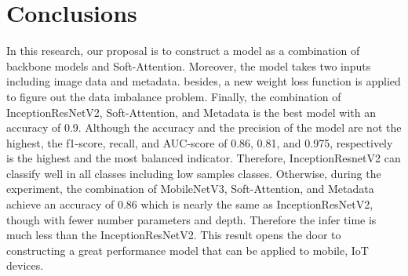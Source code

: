 \documentclass[sensors,article,submit,pdftex,moreauthors]{Definitions/mdpi}
\begin{document}
	\section{Conclusions}
	In this research, our proposal is to construct a model as a combination of backbone models and Soft-Attention. Moreover, the model takes two inputs including image data and metadata. besides, a new weight loss function is applied to figure out the data imbalance problem. Finally, the combination of InceptionResNetV2, Soft-Attention, and Metadata is the best model with an accuracy of 0.9. Although the accuracy and the precision of the model are not the highest, the f1-score, recall, and AUC-score of 0.86, 0.81, and 0.975, respectively is the highest and the most balanced indicator. Therefore, InceptionResnetV2 can classify well in all classes including low samples classes. Otherwise, during the experiment, the combination of MobileNetV3, Soft-Attention, and Metadata achieve an accuracy of 0.86 which is nearly the same as InceptionResNetV2, though with fewer number parameters and depth. Therefore the infer time is much less than the InceptionResNetV2. This result opens the door to constructing a great performance model that can be applied to mobile, IoT devices. 
	\vspace{6pt} 
	
	
	
	
\end{document}
